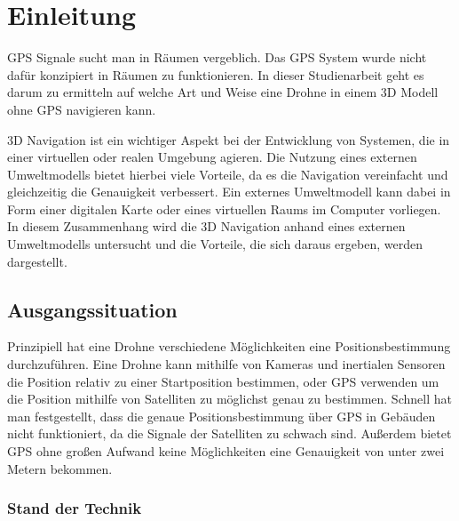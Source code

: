 \chapter{Einleitung}

GPS Signale sucht man in Räumen vergeblich. Das GPS System wurde nicht dafür konzipiert in Räumen zu funktionieren.
In dieser Studienarbeit geht es darum zu ermitteln auf welche Art und Weise eine Drohne in einem 3D Modell ohne GPS navigieren kann.

3D Navigation ist ein wichtiger Aspekt bei der Entwicklung von Systemen, die in einer virtuellen oder realen Umgebung agieren. Die Nutzung eines externen Umweltmodells bietet hierbei viele Vorteile, da es die Navigation vereinfacht und gleichzeitig die Genauigkeit verbessert. Ein externes Umweltmodell kann dabei in Form einer digitalen Karte oder eines virtuellen Raums im Computer vorliegen. In diesem Zusammenhang wird die 3D Navigation anhand eines externen Umweltmodells untersucht und die Vorteile, die sich daraus ergeben, werden dargestellt.



\section{Ausgangssituation}

Prinzipiell hat eine Drohne verschiedene Möglichkeiten eine Positionsbestimmung durchzuführen.
Eine Drohne kann mithilfe von Kameras und inertialen Sensoren die Position relativ zu einer Startposition bestimmen, oder \ac{GPS} verwenden um die Position mithilfe von Satelliten zu möglichst genau zu bestimmen.
Schnell hat man festgestellt, dass die genaue Positionsbestimmung über GPS in Gebäuden nicht funktioniert, da die Signale der Satelliten zu schwach sind. Außerdem bietet \ac{GPS} ohne großen Aufwand keine Möglichkeiten eine Genauigkeit von unter zwei Metern bekommen.

\subsection{Stand der Technik}

